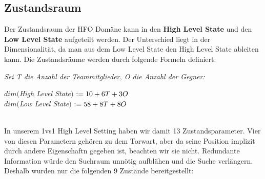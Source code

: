         \subsection{Zustandsraum} \label{statespace-definition}
            Der Zustandsraum der HFO Domäne kann in den \textbf{High Level State} und den \textbf{Low Level State} aufgeteilt werden. Der Unterschied liegt in der Dimensionalität, da man aus dem Low Level State den High Level State ableiten kann. Die Zustandsräume werden durch folgende Formeln definiert:\\
            
            \begin{mdframed}
            \textit{Sei T die Anzahl der Teammitglieder, O die Anzahl der Gegner:}
            \begin{center}
                $dim($\textit{High Level State}$)$ $ := 10 + 6T + 3O \hspace{10mm} $ \\
                $dim($\textit{Low Level State}$)$  $ := 58 + 8T + 8O \hspace{9mm} $ \\
            \end{center}
            \end{mdframed}
            \hfill  \\
            In unserem 1vs1 High Level Setting haben wir damit 13 Zustandsparameter. Vier von diesen Parametern gehören zu dem Torwart, aber da seine Position implizit durch andere Eigenschaftn gegeben ist, beachten wir sie nicht. Redundante Information würde den Suchraum unnötig aufblähen und die Suche verlängern. Deshalb wurden nur die folgenden 9 Zustände bereitgestellt:

